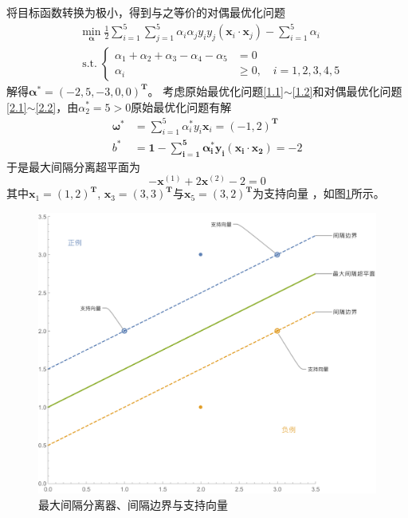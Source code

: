 \documentclass{article}
\begin{document}
将目标函数转换为极小，得到与之等价的对偶最优化问题
\begin{align*}
     & \min_{\boldsymbol{\alpha}}{\frac{1}{2}\sum_{i = 1}^{5}{\sum_{j = 1}^{5}{\alpha_i \alpha_j y_i y_j(\boldsymbol{x}_i \cdot \boldsymbol{x}_j)}} - \sum_{i = 1}^{5}{\alpha_i}} \label{2.1} \tag{2.1} \\
     & \operatorname{s.t.} \left\{
    \begin{aligned}
        \alpha _1+ \alpha _2+ \alpha _3- \alpha _4- \alpha _5 & = 0                                  \\
        \alpha_i                                              & \geqslant 0, \quad i = 1, 2, 3, 4, 5
    \end{aligned}
    \label{2.2} \tag{2.2}
    \right.
\end{align*}
解得$\boldsymbol{\alpha}^* = (-2, 5, -3, 0, 0)^\mathbf{T}$。
考虑原始最优化问题\eqref{1.1}$\sim$\eqref{1.2}和对偶最优化问题\eqref{2.1}$\sim$\eqref{2.2}，由$\alpha^*_2 = 5 > 0$原始最优化问题有解
\begin{align*}
    \boldsymbol{\omega}^* & = \sum_{i = 1}^{5}{\alpha_i^* y_i \boldsymbol{x}_i} = (-1, 2)^\mathbf{T}             \\
    b^*                   & = \boldsymbol{1 - \sum_{i = 1}^{5}{\alpha_i^* y_i(\boldsymbol{x}_i \cdot x_2)}} = -2
\end{align*}
于是最大间隔分离超平面为
\begin{equation*}
    -\boldsymbol{x}^{(1)} + 2 \boldsymbol{x}^{(2)} - 2 = 0
\end{equation*}
其中$\boldsymbol{x}_1 = (1, 2)^\mathbf{T}$, $\boldsymbol{x}_3 = (3, 3)^\mathbf{T}$与$\boldsymbol{x}_5 = (3, 2)^\mathbf{T}$为支持向量
，如图\ref{SVM}所示。
\begin{figure}
    \centering
    \includegraphics[width = \textwidth]{Figure/SVM.pdf}
    \caption{最大间隔分离器、间隔边界与支持向量}
    \label{SVM}
\end{figure}
\end{document}
